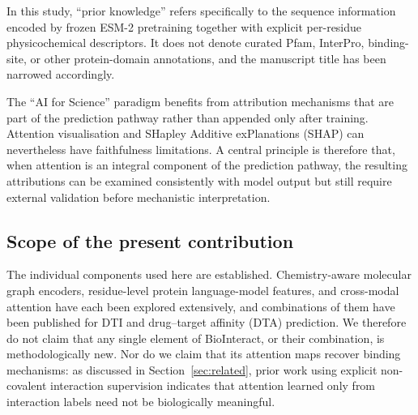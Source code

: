 \documentclass[fleqn,10pt]{wlscirep}
\begin{document}
In this study, ``prior knowledge'' refers specifically to the
sequence information encoded by frozen ESM-2 pretraining together with explicit
per-residue physicochemical descriptors. It does not denote curated Pfam,
InterPro, binding-site, or other protein-domain annotations, and the manuscript
title has been narrowed accordingly.

The ``AI for Science'' paradigm benefits from attribution mechanisms that are
part of the prediction pathway rather than appended only after training.
Attention visualisation and SHapley Additive exPlanations (SHAP) can nevertheless
have faithfulness limitations.\cite{jain2019attention} A central principle is
therefore that, when attention is an integral component of the prediction
pathway, the resulting attributions can be examined consistently with model
output but still require external validation before mechanistic interpretation.

\begingroup\color{red}
\subsection*{Scope of the present contribution}

The individual components used here are established.  Chemistry-aware molecular
graph encoders, residue-level protein language-model features, and cross-modal
attention have each been explored extensively, and combinations of them have
been published for DTI and drug--target affinity (DTA)
prediction.\cite{nguyen2022gefa,bal2023pgraphdta,li2025hcafdta}  We therefore do
not claim that any single element of BioInteract, or their combination, is
methodologically new.  Nor do we claim that its attention maps recover binding
mechanisms: as discussed in Section~\ref{sec:related}, prior work using explicit
non-covalent interaction supervision indicates that attention learned only from
interaction labels need not be biologically
meaningful.\cite{li2020monn,gim2023arkdta,seo2024blendnet}
\end{document}
